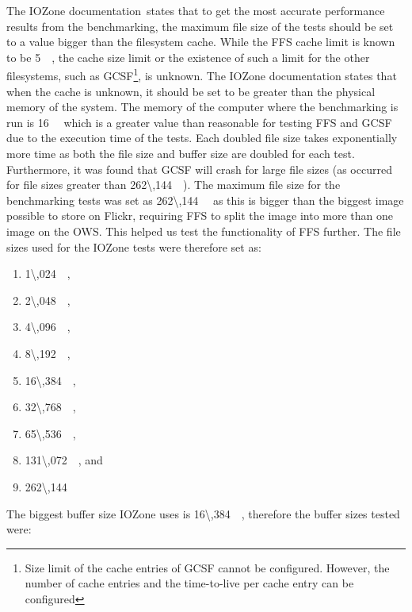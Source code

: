 The IOZone documentation\,\cite{iozoneIozoneFilesystemBenchmark} states that to get the most accurate performance results from the benchmarking, the maximum file size of the tests should be set to a value bigger than the filesystem cache. While the \gls{FFS} cache limit is known to be \SI{5}{\mega\byte}, the cache size limit or the existence of such a limit for the other filesystems, such as \gls{GCSF}\footnote{Size limit of the cache entries of \gls{GCSF} cannot be configured. However, the number of cache entries and the \mbox{time-to-live} per cache entry can be configured}, is unknown. The IOZone documentation states that when the cache is unknown, it should be set to be greater than the physical memory of the system. The memory of the computer where the benchmarking is run is \SI{16}{\giga\byte} which is a greater value than reasonable for testing \gls{FFS} and \gls{GCSF} due to the execution time of the tests. Each doubled file size takes exponentially more time as both the file size and buffer size are doubled for each test. Furthermore, it was found that \gls{GCSF} will crash for large file sizes (as occurred for file sizes greater than \SI[per-mode = symbol]{262\,144}{\kilo\byte}). The maximum file size for the benchmarking tests was set as \SI{262\,144}{\kilo\byte} as this is bigger than the biggest image possible to store on Flickr, requiring \gls{FFS} to split the image into more than one image on the \gls{OWS}. This helped us test the functionality of FFS further. The file sizes used for the IOZone tests were therefore set as:
\begin{enumerate}
	\item \SI{1\,024}{\kilo\byte},
	\item \SI{2\,048}{\kilo\byte},
	\item \SI{4\,096}{\kilo\byte},
	\item \SI{8\,192}{\kilo\byte},
	\item \SI{16\,384}{\kilo\byte},
	\item \SI{32\,768}{\kilo\byte},
	\item \SI{65\,536}{\kilo\byte},
	\item \SI{131\,072}{\kilo\byte}, and
	\item \SI{262\,144}{\kilo\byte}
\end{enumerate}
The biggest buffer size IOZone uses is \SI{16\,384}{\kilo\byte}, therefore the buffer sizes tested were:
